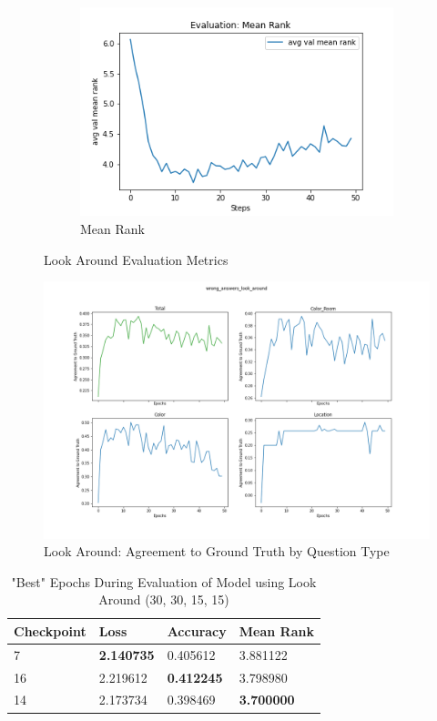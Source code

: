 \begin{figure}[H]
\begin{subfigure}[b]{0.3\textwidth}
         \includegraphics[width=\textwidth]{./figure/results/look_around/eval/avg val mean rank.png}
         \caption{Mean Rank}
         \label{fig:la_e_mean_rank}
     \end{subfigure}
     \caption{Look Around Evaluation Metrics}
     \label{fig:la_e_metrics}
\end{figure}

\begin{figure}[H]
	\centuring
	\includegraphics[width=\textwidth]{./figure/wrong_answers/wrong_answers_look_around.png}
	\caption{Look Around: Agreement to Ground Truth by Question Type}
	\label{fig:la_agreement}
\end{figure}


\begin{table}[H]
\centering
\caption{"Best" Epochs During Evaluation of Model using Look Around (30, 30, 15, 15)}
\begin{tabular}{l | l | l | l}
Checkpoint & Loss & Accuracy & Mean Rank \\
\hline
7 & \textbf{2.140735} & 0.405612 & 3.881122 \\
16 & 2.219612 & \textbf{0.412245} & 3.798980 \\
14 & 2.173734 & 0.398469 & \textbf{3.700000} 
\end{tabular}
\label{tab:best_look_around}
\end{table}

